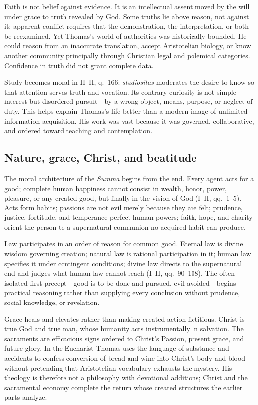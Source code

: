 Faith is not belief against evidence.  It is an intellectual assent moved by
the will under grace to truth revealed by God.  Some truths lie above reason,
not against it; apparent conflict requires that the demonstration, the
interpretation, or both be reexamined.  Yet Thomas's world of authorities was
historically bounded.  He could reason from an inaccurate translation, accept
Aristotelian biology, or know another community principally through Christian
legal and polemical categories.  Confidence in truth did not grant complete
data.

Study becomes moral in II--II, q.~166: \emph{studiositas} moderates the desire
to know so that attention serves truth and vocation.  Its contrary curiosity
is not simple interest but disordered pursuit---by a wrong object, means,
purpose, or neglect of duty.  This helps explain Thomas's life better than a
modern image of unlimited information acquisition.  His work was vast because
it was governed, collaborative, and ordered toward teaching and contemplation.

\subsection{Nature, grace, Christ, and beatitude}

The moral architecture of the \emph{Summa} begins from the end.  Every agent
acts for a good; complete human happiness cannot consist in wealth, honor,
power, pleasure, or any created good, but finally in the vision of God (I--II,
qq.~1--5).  Acts form habits; passions are not evil merely because they are
felt; prudence, justice, fortitude, and temperance perfect human powers; faith,
hope, and charity orient the person to a supernatural communion no acquired
habit can produce.

Law participates in an order of reason for common good.  Eternal law is divine
wisdom governing creation; natural law is rational participation in it; human
law specifies it under contingent conditions; divine law directs to the
supernatural end and judges what human law cannot reach (I--II, qq.~90--108).
The often-isolated first precept---good is to be done and pursued, evil
avoided---begins practical reasoning rather than supplying every conclusion
without prudence, social knowledge, or revelation.

Grace heals and elevates rather than making created action fictitious.  Christ
is true God and true man, whose humanity acts instrumentally in salvation.
The sacraments are efficacious signs ordered to Christ's Passion, present grace,
and future glory.  In the Eucharist Thomas uses the language of substance and
accidents to confess conversion of bread and wine into Christ's body and blood
without pretending that Aristotelian vocabulary exhausts the mystery.  His
theology is therefore not a philosophy with devotional additions; Christ and
the sacramental economy complete the return whose created structures the
earlier parts analyze.

